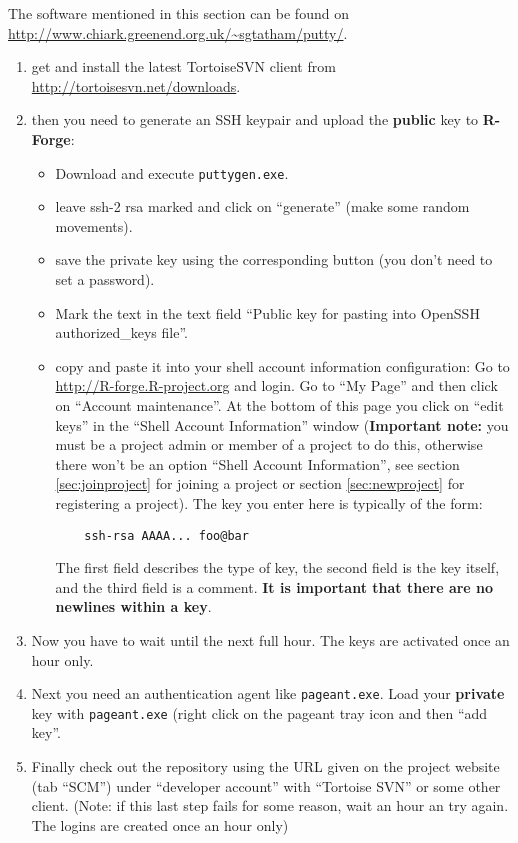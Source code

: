 \documentclass[a4paper]{report}
\begin{document}
The software mentioned in this section can be found
on\newline
\url{http://www.chiark.greenend.org.uk/~sgtatham/putty/}.
\begin{enumerate}
\item get and install the latest TortoiseSVN client from
  \url{http://tortoisesvn.net/downloads}.
\item then you need to generate an SSH keypair and upload the \textbf{public}
  key to \textbf{R-Forge}:
  \begin{itemize}
  \item Download and execute \texttt{puttygen.exe}.
  \item leave ssh-2 rsa marked and click on ``generate'' (make some
    random movements).
  \item save the private key using the corresponding button (you don't
    need to set a password).
  \item  Mark the text in the text field ``Public key
    for pasting into OpenSSH authorized\_keys file''.
  \item copy and paste it into your shell account information
    configuration: Go to \url{http://R-forge.R-project.org} and
    login. Go to ``My Page'' and then click on ``Account
    maintenance''. At the bottom 
    of this page you click on ``edit keys'' in the ``Shell Account
    Information'' window (\textbf{Important note:} you must be a project admin
    or member of a project to do this, otherwise there won't be an
    option ``Shell Account Information'', see section
    \ref{sec:joinproject} for joining a project or section
    \ref{sec:newproject} for registering a project).
    The key you enter here is typically of the form:
    \begin{verbatim}
    ssh-rsa AAAA... foo@bar
    \end{verbatim}
    The first field
    describes the type of key, the second field is the key itself, and
    the third field is a comment. \textbf{It is important that there are no
      newlines within a key}.
  \end{itemize}
\item Now you have to wait until the next full hour. The keys are
  activated once an hour only.
\item Next you need an authentication agent like \texttt{pageant.exe}. Load
  your \textbf{private} key with \texttt{pageant.exe} (right click on
  the pageant tray icon and then ``add key''.
\item Finally check out the repository using the URL given on the
  project website (tab ``SCM'') under ``developer account'' with
  ``Tortoise SVN'' or some other client. (Note: if this last step
  fails for some reason, wait an hour an try again. The logins are
  created once an hour only)
\end{enumerate}
\end{document}
